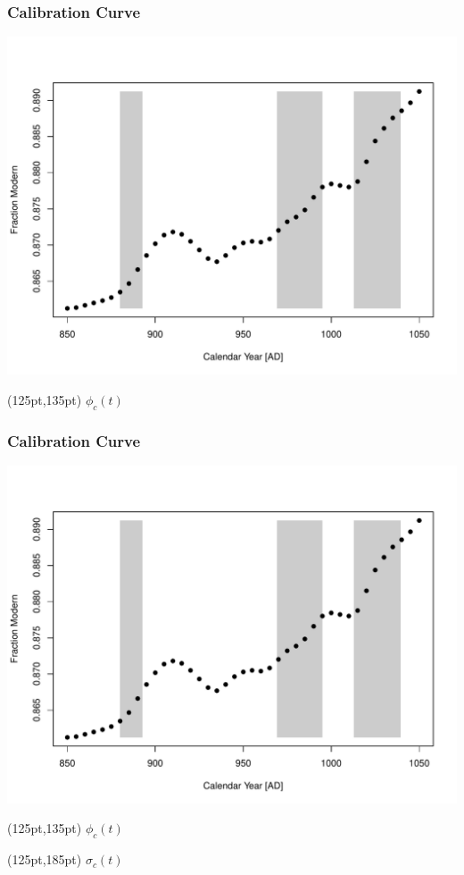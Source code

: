 \documentclass{beamer}
\begin{document}
\begin{frame}[t]
  \frametitle{Calibration Curve}
    \includegraphics[height=.85\textheight]{single_obs_inf_plot2.pdf}
    \begin{textblock*}{100pt}(125pt,135pt)
      \Large $\phi_c(t)$ \normalsize
	\end{textblock*}   
\end{frame}

\begin{frame}[t]
  \frametitle{Calibration Curve}
    \includegraphics[height=.85\textheight]{single_obs_inf_plot2.pdf}
    \begin{textblock*}{100pt}(125pt,135pt)
      \Large $\phi_c(t)$ \normalsize
	\end{textblock*}   
    \begin{textblock*}{100pt}(125pt,185pt)
      \Large $\sigma_c(t)$ \normalsize
	\end{textblock*}   
\end{frame}
\end{document}
